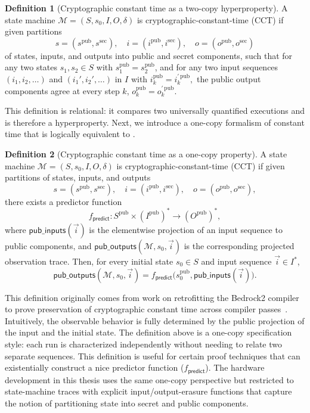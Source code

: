 \documentclass[fontset=fira-newtxsf]{mitthesis}
\theoremstyle{definition}
\newtheorem{definition}{Definition}[section]
\theoremstyle{plain}
\begin{document}
\begin{definition}[Cryptographic constant time as a two-copy hyperproperty] \label{def:two-copy}
A state machine $\mathcal{M} = (S, s_0, I, O, \delta)$ is cryptographic-constant-time (CCT)
if given partitions
\[
  s = (s^{\mathrm{pub}}, s^{\mathrm{sec}}), \quad
  i = (i^{\mathrm{pub}}, i^{\mathrm{sec}}), \quad
  o = (o^{\mathrm{pub}}, o^{\mathrm{sec}})
\]
of states, inputs, and outputs into public and secret components, such that for any two
states $s_1, s_2 \in S$ with $s_1^{\mathrm{pub}} = s_2^{\mathrm{pub}}$, and for any two
input sequences $(i_1, i_2, \ldots)$ and $(i_1', i_2', \ldots)$ in $I$ with $i_k^{\mathrm{pub}} = i_k^{\prime\,\mathrm{pub}},$
the public output components agree at every step $k$, $o_k^{\mathrm{pub}} = o_k^{\prime\,\mathrm{pub}}.$
\end{definition}

This definition is relational: it compares two universally quantified executions and is therefore a hyperproperty.
Next, we introduce a one-copy formalism of constant time that is logically equivalent to .

\begin{definition}[Cryptographic constant time as a one-copy property]
A state machine $\mathcal{M} = (S, s_0, I, O, \delta)$ is cryptographic-constant-time (CCT)
if given partitions of states, inputs, and outputs
\[
  s = (s^{\mathrm{pub}}, s^{\mathrm{sec}}), \quad
  i = (i^{\mathrm{pub}}, i^{\mathrm{sec}}), \quad
  o = (o^{\mathrm{pub}}, o^{\mathrm{sec}})
,\]
there exists a predictor function
\[
  f_\textsf{predict}
  :
  S^{\mathrm{pub}} \times (I^{\mathrm{pub}})^* \to (O^{\mathrm{pub}})^*
,\]
where $\mathsf{pub\_inputs}(\vec{i})$ is the elementwise projection of an input sequence
to public components, and $\mathsf{pub\_outputs}(\mathcal{M}, s_0, \vec{i})$ is the corresponding projected observation trace.
Then, for every initial state $s_0 \in S$ and input sequence $\vec{i} \in I^*$,
\[
  \mathsf{pub\_outputs}(\mathcal{M},s_0,\vec{i})
  =
  f_\textsf{predict}\bigl(s_0^{\mathrm{pub}},\mathsf{pub\_inputs}(\vec{i})\bigr).
\]
\end{definition}

This definition originally comes from work on retrofitting the Bedrock2 compiler to prove preservation of cryptographic constant time across compiler passes~\cite{conoly2025}.
Intuitively, the observable behavior is fully determined by the public projection of the input and the initial state.
The definition above is a one-copy specification style: each run is characterized independently without needing to relate two separate sequences.
This definition is useful for certain proof techniques that can existentially construct a nice predictor function ($f_\textsf{predict}$).
The hardware development in this thesis uses the same one-copy perspective but restricted to state-machine traces with explicit input/output-erasure functions that capture the notion of partitioning state into secret and public components.
\end{document}

